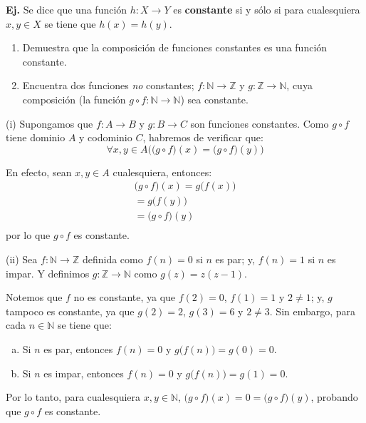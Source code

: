 \documentclass[letterpaper,DIV=14,headsepline,12pt]{scrartcl}
\makeatletter
\newcounter{Ejer}
\newcommand{\pts}{}
\newenvironment{ejercicio}[1]{\noindent
    \ifthenelse{\equal{#1}{1} \OR \equal{#1}{+1}}{\renewcommand{\pts}{\textbf{(#1 pt)}}}{\renewcommand{\pts}{\textbf{(#1 pts)}}}\textbf{Ej. \theEjer} \pts\stepcounter{Ejer}}{\vspace{.3cm}}
\newenvironment{solucion}[1][]{%
        \par\pushQED{\hfill \lozenge}%
        \normalfont\topsep6pt \partopsep0pt %
        \trivlist
        \item[\hskip\labelsep
                \textbf{\textit{Solución.}}%
        ]#1
        }{%
        \popQED\endtrivlist\@endpefalse
    }
\makeatother
\begin{document}
    \begin{ejercicio}{2.5}
        Se dice que una función $h:X \to Y$ es \textbf{constante} si y sólo si para cualesquiera $x,y \in X$ se tiene que $h(x)=h(y)$.
        \begin{enumerate}
            \item Demuestra que la composición de funciones constantes es una función constante.
            \item Encuentra dos funciones \textit{no} constantes; $f:\mathbb{N} \to \mathbb{Z}$ y $g:\mathbb{Z}\to \mathbb{N}$, cuya composición (la función $g \circ f:\mathbb{N} \to \mathbb{N}$) sea constante.
        \end{enumerate}
    \end{ejercicio}
    \begin{solucion}
        (i) Supongamos que $f:A \to B$ y $g:B \to C$ son funciones constantes. Como $g \circ f$ tiene dominio $A$ y codominio $C$, habremos de verificar que:
        \[ \forall x,y \in A \big( \big(g \circ f\big)(x) = \big(g \circ f\big)(y) \big) \]

        En efecto, sean $x,y \in A$ cualesquiera, entonces:
        \begin{align*}
            \big(g \circ f\big) (x) = g\big(f (x) \big) \tag*{Def. de composición} \\
            = g\big(f (y) \big) \tag*{$f$ es constante} \\
            = \big(g \circ f\big) (y) \tag*{Def. de composición} \\
        \end{align*}
        por lo que $g \circ f$ es constante.

        (ii) Sea $f:\mathbb{N} \to \mathbb{Z}$ definida como $f(n)=0$ si $n$ es par; y, $f(n)=1$ si $n$ es impar. Y definimos $g:\mathbb{Z} \to \mathbb{N}$ como $g(z)=z(z-1)$.

        Notemos que $f$ no es constante, ya que $f(2)=0$, $f(1)=1$ y $2 \neq 1$; y, $g$ tampoco es constante, ya que $g(2)=2$, $g(3)=6$ y $2 \neq 3$. Sin embargo, para cada $n \in \mathbb{N}$ se tiene que:
        \begin{enumerate}[a)]
            \item Si $n$ es par, entonces $f(n)=0$ y $g\big( f(n)\big)=g(0)=0$.
            \item Si $n$ es impar, entonces $f(n)=0$ y $g\big( f(n)\big)=g(1)=0$.
        \end{enumerate}
        
        Por lo tanto, para cualesquiera $x,y \in \mathbb{N}$, $\big(g \circ f\big) (x)=0=\big(g \circ f\big) (y)$, probando que $g \circ f$ es constante.
    \end{solucion}
    
\end{document}
